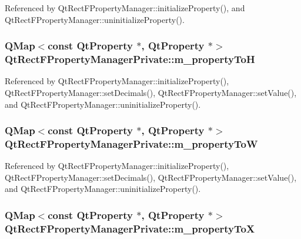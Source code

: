 Referenced by Qt\+Rect\+F\+Property\+Manager\+::initialize\+Property(), and Qt\+Rect\+F\+Property\+Manager\+::uninitialize\+Property().

\subsubsection[{m\+\_\+property\+ToH}]{\setlength{\rightskip}{0pt plus 5cm}Q\+Map$<$const {\bf Qt\+Property} $\ast$, {\bf Qt\+Property} $\ast$$>$ Qt\+Rect\+F\+Property\+Manager\+Private\+::m\+\_\+property\+ToH}\label{classQtRectFPropertyManagerPrivate_ade4ebc540d8addbcd4030c16c786a287}


Referenced by Qt\+Rect\+F\+Property\+Manager\+::initialize\+Property(), Qt\+Rect\+F\+Property\+Manager\+::set\+Decimals(), Qt\+Rect\+F\+Property\+Manager\+::set\+Value(), and Qt\+Rect\+F\+Property\+Manager\+::uninitialize\+Property().

\subsubsection[{m\+\_\+property\+ToW}]{\setlength{\rightskip}{0pt plus 5cm}Q\+Map$<$const {\bf Qt\+Property} $\ast$, {\bf Qt\+Property} $\ast$$>$ Qt\+Rect\+F\+Property\+Manager\+Private\+::m\+\_\+property\+ToW}\label{classQtRectFPropertyManagerPrivate_ae3b6d2611360a0fe19082d5a80440da9}


Referenced by Qt\+Rect\+F\+Property\+Manager\+::initialize\+Property(), Qt\+Rect\+F\+Property\+Manager\+::set\+Decimals(), Qt\+Rect\+F\+Property\+Manager\+::set\+Value(), and Qt\+Rect\+F\+Property\+Manager\+::uninitialize\+Property().

\subsubsection[{m\+\_\+property\+ToX}]{\setlength{\rightskip}{0pt plus 5cm}Q\+Map$<$const {\bf Qt\+Property} $\ast$, {\bf Qt\+Property} $\ast$$>$ Qt\+Rect\+F\+Property\+Manager\+Private\+::m\+\_\+property\+ToX}\label{classQtRectFPropertyManagerPrivate_ade69a4eb8876b77dc6fb70fdea707e42}


